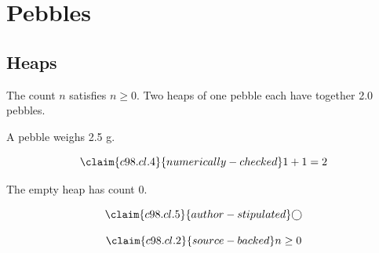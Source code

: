 \chapter{Pebbles}\label{c98}
\section{Heaps}\label{c98.s1}

\begin{theorem}[Count]\label{c98.thm.count}
  The count $n$ satisfies $n \geq 0$.
  Two heaps of one pebble each have together
  \num[c98.cl.4]{2.0}{} pebbles.
\end{theorem}

A pebble weighs 2.5 g.

\begin{equation}\label{c98.eq.sum}\claim{c98.cl.4}{numerically-checked}
  1 + 1 = 2
\end{equation}

\begin{lemma}[Empty]\label{c98.lem.empty}
  The empty heap has count $0$.
\end{lemma}

\begin{equation}\label{c98.eq.circle}\claim{c98.cl.5}{author-stipulated}
  \bigcirc
\end{equation}

\begin{vertiefung}[id=c98.v1, titel={T}, wozu={W}, voraussetzung={V}, zurueck={Z}]
  \begin{equation}\label{c98.eq.page}\claim{c98.cl.2}{source-backed}
    n \geq 0
  \end{equation}
\end{vertiefung}
